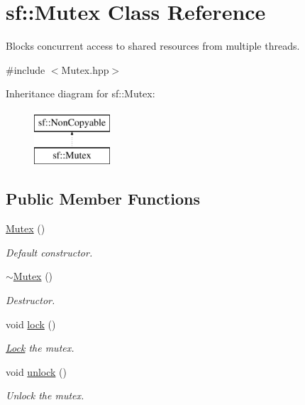 \hypertarget{classsf_1_1_mutex}{}\section{sf\+:\+:Mutex Class Reference}
\label{classsf_1_1_mutex}


Blocks concurrent access to shared resources from multiple threads.  




{\ttfamily \#include $<$Mutex.\+hpp$>$}

Inheritance diagram for sf\+:\+:Mutex\+:\begin{figure}[H]
\begin{center}
\leavevmode
\includegraphics[height=2.000000cm]{classsf_1_1_mutex}
\end{center}
\end{figure}
\subsection*{Public Member Functions}
\begin{DoxyCompactItemize}
\item 
\mbox{\hyperlink{classsf_1_1_mutex_a9bd52a48320fd7b6db8a78037aad276e}{Mutex}} ()
\begin{DoxyCompactList}\small\item\em Default constructor. \end{DoxyCompactList}\item 
\mbox{\hyperlink{classsf_1_1_mutex_a9f76a67b7b6d3918131a692179b4e3f2}{$\sim$\+Mutex}} ()
\begin{DoxyCompactList}\small\item\em Destructor. \end{DoxyCompactList}\item 
void \mbox{\hyperlink{classsf_1_1_mutex_a1a16956a6bbea764480c1b80f2e45763}{lock}} ()
\begin{DoxyCompactList}\small\item\em \mbox{\hyperlink{classsf_1_1_lock}{Lock}} the mutex. \end{DoxyCompactList}\item 
void \mbox{\hyperlink{classsf_1_1_mutex_ade71268ffc5e80756652058b01c23c33}{unlock}} ()
\begin{DoxyCompactList}\small\item\em Unlock the mutex. \end{DoxyCompactList}\end{DoxyCompactItemize}
